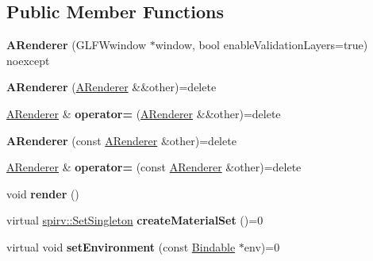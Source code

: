 \subsection*{Public Member Functions}
\begin{DoxyCompactItemize}
\item 
\mbox{\label{classblaze_1_1ARenderer_a50df05637f7901c6c250cac7589339b3}} 
{\bfseries A\+Renderer} (G\+L\+F\+Wwindow $\ast$window, bool enable\+Validation\+Layers=true) noexcept
\item 
\mbox{\label{classblaze_1_1ARenderer_a6afdc08bbc3b63db882d905da16e21d6}} 
{\bfseries A\+Renderer} (\hyperlink{classblaze_1_1ARenderer}{A\+Renderer} \&\&other)=delete
\item 
\mbox{\label{classblaze_1_1ARenderer_a88a86e280f936a5c87869f933a753e7c}} 
\hyperlink{classblaze_1_1ARenderer}{A\+Renderer} \& {\bfseries operator=} (\hyperlink{classblaze_1_1ARenderer}{A\+Renderer} \&\&other)=delete
\item 
\mbox{\label{classblaze_1_1ARenderer_a5569c604df77ac33fdb245bc71b8ed32}} 
{\bfseries A\+Renderer} (const \hyperlink{classblaze_1_1ARenderer}{A\+Renderer} \&other)=delete
\item 
\mbox{\label{classblaze_1_1ARenderer_ab805d9247321d41fae868da36fe83d91}} 
\hyperlink{classblaze_1_1ARenderer}{A\+Renderer} \& {\bfseries operator=} (const \hyperlink{classblaze_1_1ARenderer}{A\+Renderer} \&other)=delete
\item 
\mbox{\label{classblaze_1_1ARenderer_acf2380c5d2277beec46cddcc6f6a1ecb}} 
void {\bfseries render} ()
\item 
\mbox{\label{classblaze_1_1ARenderer_a0d1b8749a57e76e1b77500b1f0ee5156}} 
virtual \hyperlink{structblaze_1_1spirv_1_1SetSingleton}{spirv\+::\+Set\+Singleton} {\bfseries create\+Material\+Set} ()=0
\item 
\mbox{\label{classblaze_1_1ARenderer_a902ff28fc355bc4d076a9bb8fde8e646}} 
virtual void {\bfseries set\+Environment} (const \hyperlink{classblaze_1_1Bindable}{Bindable} $\ast$env)=0

\end{DoxyCompactItemize}
